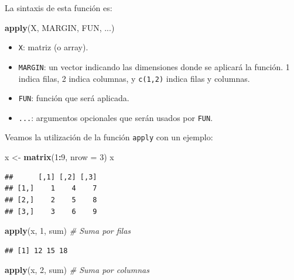 \documentclass[
]{book}
\newenvironment{Shaded}{\begin{snugshade}}{\end{snugshade}}
\newcommand{\AttributeTok}[1]{\textcolor[rgb]{0.13,0.29,0.53}{#1}}
\newcommand{\CommentTok}[1]{\textcolor[rgb]{0.56,0.35,0.01}{\textit{#1}}}
\newcommand{\DecValTok}[1]{\textcolor[rgb]{0.00,0.00,0.81}{#1}}
\newcommand{\FunctionTok}[1]{\textcolor[rgb]{0.13,0.29,0.53}{\textbf{#1}}}
\newcommand{\NormalTok}[1]{#1}
\newcommand{\OtherTok}[1]{\textcolor[rgb]{0.56,0.35,0.01}{#1}}
\newcommand{\SpecialCharTok}[1]{\textcolor[rgb]{0.81,0.36,0.00}{\textbf{#1}}}
\providecommand{\tightlist}{%
  \setlength{\itemsep}{0pt}\setlength{\parskip}{0pt}}
\begin{document}
La sintaxis de esta función es:

\begin{Shaded}
\begin{Highlighting}[]
\FunctionTok{apply}\NormalTok{(X, MARGIN, FUN, ...)}
\end{Highlighting}
\end{Shaded}

\begin{itemize}
\tightlist
\item
  \texttt{X}: matriz (o array).
\item
  \texttt{MARGIN}: un vector indicando las dimensiones donde se aplicará
  la función. 1 indica filas, 2 indica columnas, y \texttt{c(1,2)} indica
  filas y columnas.
\item
  \texttt{FUN}: función que será aplicada.
\item
  \texttt{...}: argumentos opcionales que serán usados por \texttt{FUN}.
\end{itemize}

Veamos la utilización de la función \texttt{apply} con un ejemplo:

\begin{Shaded}
\begin{Highlighting}[]
\NormalTok{x }\OtherTok{\textless{}{-}} \FunctionTok{matrix}\NormalTok{(}\DecValTok{1}\SpecialCharTok{:}\DecValTok{9}\NormalTok{, }\AttributeTok{nrow =} \DecValTok{3}\NormalTok{)}
\NormalTok{x}
\end{Highlighting}
\end{Shaded}

\begin{verbatim}
##      [,1] [,2] [,3]
## [1,]    1    4    7
## [2,]    2    5    8
## [3,]    3    6    9
\end{verbatim}

\begin{Shaded}
\begin{Highlighting}[]
\FunctionTok{apply}\NormalTok{(x, }\DecValTok{1}\NormalTok{, sum)    }\CommentTok{\# Suma por filas}
\end{Highlighting}
\end{Shaded}

\begin{verbatim}
## [1] 12 15 18
\end{verbatim}

\begin{Shaded}
\begin{Highlighting}[]
\FunctionTok{apply}\NormalTok{(x, }\DecValTok{2}\NormalTok{, sum)    }\CommentTok{\# Suma por columnas}
\end{Highlighting}
\end{Shaded}
\end{document}
